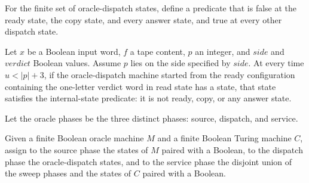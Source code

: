 \begin{definition}
\label{Turing.oracleDispatchInternal}
\leanok
{}
For the finite set of oracle-dispatch states, define a predicate that is false at the
ready state, the copy state, and every answer state, and true at every other dispatch
state.
\end{definition}

\begin{theorem}
\label{Turing.oracleRestore_cut}
\leanok
{}
Let $x$ be a Boolean input word, $f$ a tape content, $p$ an integer, and $side$ and
$verdict$ Boolean values. Assume $p$ lies on the side specified by $side$. At every time
$u<|p|+3$, if the oracle-dispatch machine started from the ready configuration
containing the one-letter verdict word in read state has a state, that state satisfies
the internal-state predicate: it is not ready, copy, or any answer state.
\end{theorem}

\begin{definition}
\label{Turing.OraclePhase}
\leanok
Let the oracle phases be the three distinct phases: source, dispatch, and service.
\end{definition}

\begin{definition}
\label{Turing.oraclePhaseState}
\leanok
{}
Given a finite Boolean oracle machine $M$ and a finite Boolean Turing machine $C$,
assign to the source phase the states of $M$ paired with a Boolean, to the dispatch
phase the oracle-dispatch states, and to the service phase the disjoint union of the
sweep phases and the states of $C$ paired with a Boolean.
\end{definition}

